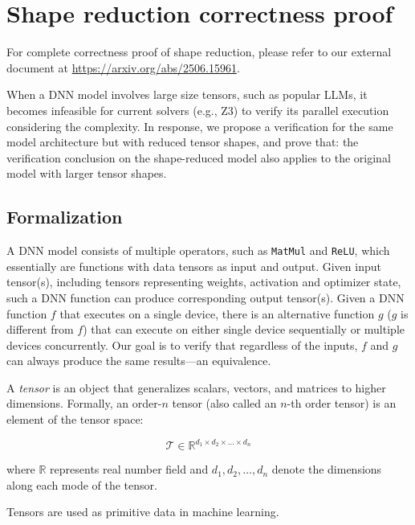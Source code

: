 \section{Shape reduction correctness proof}
\label{appx:sec:dim_red}
For complete correctness proof of shape reduction, please refer to our external document at \url{https://arxiv.org/abs/2506.15961}.



When a DNN model involves large size tensors, such as popular LLMs, it becomes
infeasible for current solvers (e.g., Z3) to verify its parallel execution
considering the complexity.
In response, we propose a verification for the same model architecture but with reduced tensor shapes, and prove that:
the verification conclusion on the shape-reduced model also applies to the original model with larger tensor shapes.

\subsection{Formalization}

A DNN model consists of multiple operators, such as \texttt{MatMul} and
\texttt{ReLU}, which essentially are functions with data tensors as input and output.
Given input tensor(s), including tensors representing weights,
activation and optimizer state, such a DNN function can produce corresponding
output tensor(s).
Given a DNN function $f$ that executes on a single device, there is an
alternative function $g$ ($g$ is
different from $f$) that can execute on either
single device sequentially or multiple devices concurrently.
Our goal is to verify that
regardless of the inputs,
$f$ and $g$ can always produce the same results---an equivalence.

\begin{definition}[Tensor]
A \textit{tensor} is an object that generalizes scalars, vectors,
    and matrices to higher dimensions.
    Formally, an order-$n$ tensor (also called an $n$-th order tensor)
    is an element of the tensor space:

\begin{equation}
\mathcal{T} \in \mathbb{R}^{d_1 \times d_2 \times \dots \times d_n}
\end{equation}

where $\mathbb{R}$ represents real number field and $d_1, d_2, \dots, d_n$ denote the
    dimensions along each mode of the tensor.


Tensors are used as primitive data in machine learning.

\end{definition}


